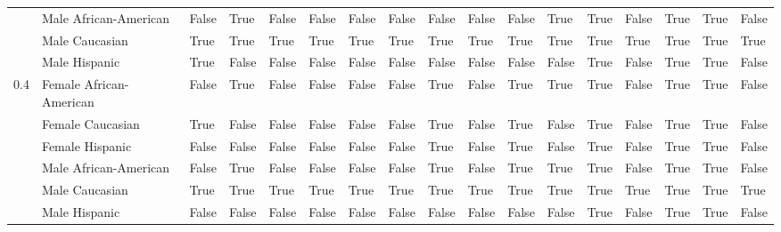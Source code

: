 \begin{tabular}{lllllllllllllllll}
    & Male African-American &       False &        True &                  False &       False &          False &                False &           False &       False &       False &        True &              True &         False &        True &           True &               False \\
    & Male Caucasian &        True &        True &                   True &        True &           True &                 True &            True &        True &        True &        True &              True &          True &        True &           True &                True \\
    & Male Hispanic &        True &       False &                  False &       False &          False &                False &           False &       False &       False &       False &              True &         False &        True &           True &               False \\
0.4 & Female African-American &       False &        True &                  False &       False &          False &                False &            True &       False &        True &        True &              True &         False &        True &           True &               False \\
    & Female Caucasian &        True &       False &                  False &       False &          False &                False &            True &       False &        True &       False &              True &         False &        True &           True &               False \\
    & Female Hispanic &       False &       False &                  False &       False &          False &                False &            True &       False &        True &       False &              True &         False &        True &           True &               False \\
    & Male African-American &       False &        True &                  False &       False &          False &                False &            True &       False &        True &        True &              True &         False &        True &           True &               False \\
    & Male Caucasian &        True &        True &                   True &        True &           True &                 True &            True &        True &        True &        True &              True &          True &        True &           True &                True \\
    & Male Hispanic &       False &       False &                  False &       False &          False &                False &           False &       False &       False &       False &              True &         False &        True &           True &               False \\
\bottomrule
\end{tabular}

